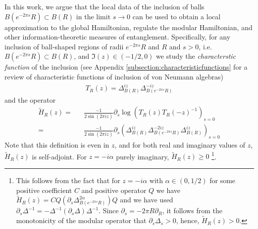 \documentclass[a4paper,11pt]{article}
\theoremstyle{definition}
\newcommand{\nn}{\nonumber}
\newcommand{\lb}{\left(}
\newcommand{\rb}{\right)}
\newcommand{\p}{\partial}
\begin{document}
In this work, we argue that the local data of the inclusion of balls $B(e^{-2\pi s}R)\subset B(R)$ in the limit $s\to 0$ can be used to obtain a local approximation to the global Hamiltonian, regulate the modular Hamiltonian, and other information-theoretic measures of entanglement. 
Specifically, for any inclusion of ball-shaped regions of radii  $e^{-2\pi s}R$ and $R$ and $s>0$, i.e. $B(e^{-2\pi s}R)\subset B(R)$, and $\Im(z)\in (-1/2,0)$ we study the {\it characterstic function} of the inclusion (see Appendix \ref{subsection:characteristicfunctions} for a review of characteristic functions of inclusion of von Neumann algebras)
\begin{eqnarray}
    T_R(z)=\Delta_{B(R)}^{iz} \Delta_{B(e^{-2\pi s}R)}^{-iz}
\end{eqnarray}
and the operator
\begin{eqnarray}\label{proposal}
    \tilde{H}_R(z)=&&\frac{{-1}}{2\sin(2\pi i z)}\p_s\log(T_R(z)T_R(-z)^{-1})_{s=0}
    \nn\\
    =&&\frac{{-1}}{2\sin(2\pi i z)}\p_s\lb\Delta_{B(R)}^{i z} \Delta_{B(e^{-2\pi s}R)}^{-2iz} \Delta_{B(R)}^{iz}\rb_{s=0}
\end{eqnarray}
Note that this definition is even in $z$, and for both real and imaginary values of $z$, $\tilde{H}_R(z)$ is self-adjoint. For $z=-i\alpha$ purely imaginary, $\tilde{H}_R(z)\geq 0$ \footnote{This follows from the fact that for $z=-i\alpha$ with $\alpha\in (0,1/2)$ for some positive coefficient $C$ and positive operator $Q$ we have $\tilde{H}_R(z)=C Q(\p_s\Delta_{B(e^{-2\pi s}R)}^{2\alpha})Q$ and we have used $\p_s\Delta^{-1}=-\Delta^{-1}(\p_s\Delta)\Delta^{-1}$. Since $\p_s=-2\pi R\p_R$, it follows from the monotonicity of the modular operator that $\p_s\Delta_s>0$, hence, $\tilde{H}_R(z)>0$.}.
\end{document}
